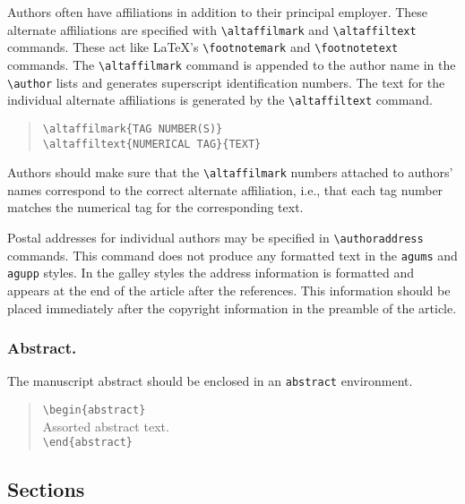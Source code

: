 Authors often have affiliations in addition to their principal 
employer.  These alternate affiliations are specified with 
\verb"\altaffilmark" and \verb"\altaffiltext" commands.  These 
act like \LaTeX's \verb"\footnotemark" and \verb"\footnotetext" 
commands.  The \verb"\altaffilmark" command is appended to the 
author name in the \verb"\author" lists and generates superscript 
identification numbers.  The text for the individual alternate 
affiliations is generated by the \verb"\altaffiltext" command.
\begin{quote}
\verb"\altaffilmark{TAG NUMBER(S)}"\\
\verb"\altaffiltext{NUMERICAL TAG}{TEXT}"
\end{quote}
Authors should make sure that the \verb"\altaffilmark" 
numbers attached to authors' names correspond to the 
correct alternate affiliation, i.e., that each tag number 
matches the numerical tag for the corresponding text.

Postal addresses for individual authors may be specified in 
\verb"\authoraddress" commands.  This command does not produce 
any formatted text in the {\tt agums} and {\tt agupp} styles.  
In the galley styles the address information is formatted and 
appears at the end of the article after the ref\-erences.  This 
information should be placed immediately after the copyright 
information in the preamble of the article.

\subsubsection{Abstract.}The manuscript abstract should be enclosed 
in an {\tt abstract} environment.
\begin{quote}
\verb"\begin{abstract}"\\
Assorted abstract text.\\
\verb"\end{abstract}"
\end{quote}

\subsection{Sections}

